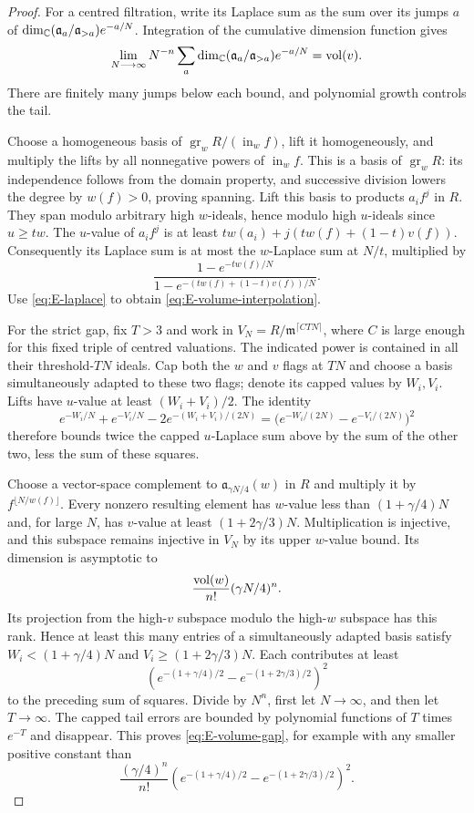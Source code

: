 \begin{proof}
For a centred filtration, write its Laplace sum as the sum over its
jumps $a$ of
$\dim_\mathbb C(\mathfrak a_a/\mathfrak a_{>a})e^{-a/N}$.
Integration of the cumulative dimension function gives
\begin{equation}\label{eq:E-laplace}
 \lim_{N\longrightarrow\infty}N^{-n}
  \sum_a\dim_\mathbb C(\mathfrak a_a/\mathfrak a_{>a})e^{-a/N}
 =\operatorname{vol}(v).
\end{equation}
There are finitely many jumps below each bound, and polynomial growth
controls the tail.

Choose a homogeneous basis of
$\operatorname{gr}_wR/(\operatorname{in}_wf)$, lift it homogeneously,
and multiply the lifts by all nonnegative powers of
$\operatorname{in}_wf$. This is a basis of $\operatorname{gr}_wR$:
its independence follows from the domain property, and successive
division lowers the degree by $w(f)>0$, proving spanning.
Lift this basis to products $a_if^j$ in $R$. They span modulo arbitrary
high $w$-ideals, hence modulo high $u$-ideals since $u\ge tw$.
The $u$-value of $a_if^j$ is at least
$tw(a_i)+j(tw(f)+(1-t)v(f))$. Consequently its Laplace sum is at most
the $w$-Laplace sum at $N/t$, multiplied by
\[
 \frac{1-e^{-tw(f)/N}}
      {1-e^{-(tw(f)+(1-t)v(f))/N}}.
\]
Use \eqref{eq:E-laplace} to obtain
\eqref{eq:E-volume-interpolation}.

For the strict gap, fix $T>3$ and work in
$V_N=R/\mathfrak m^{\lceil CTN\rceil}$, where $C$ is large enough
for this fixed triple of centred valuations. The indicated power is
contained in all their threshold-$TN$ ideals. Cap both the $w$ and
$v$ flags at $TN$ and choose a basis simultaneously adapted to these
two flags; denote its capped values by $W_i,V_i$.
Lifts have $u$-value at least $(W_i+V_i)/2$. The identity
\[
 e^{-W_i/N}+e^{-V_i/N}-2e^{-(W_i+V_i)/(2N)}
     =\bigl(e^{-W_i/(2N)}-e^{-V_i/(2N)}\bigr)^2
\]
therefore bounds twice the capped $u$-Laplace sum above by the sum of
the other two, less the sum of these squares.

Choose a vector-space complement to
$\mathfrak a_{\gamma N/4}(w)$ in $R$ and multiply it by
$f^{\lfloor N/w(f)\rfloor}$. Every nonzero resulting element has
$w$-value less than $(1+\gamma/4)N$ and, for large $N$, has $v$-value
at least $(1+2\gamma/3)N$. Multiplication is injective, and this
subspace remains injective in $V_N$ by its upper $w$-value bound.
Its dimension is asymptotic to
\[
 \frac{\operatorname{vol}(w)}{n!}(\gamma N/4)^n.
\]
Its projection from the high-$v$ subspace modulo the high-$w$
subspace has this rank. Hence at least this many entries of a
simultaneously adapted basis satisfy
$W_i<(1+\gamma/4)N$ and $V_i\ge(1+2\gamma/3)N$.
Each contributes at least
\[
 \left(e^{-(1+\gamma/4)/2}-e^{-(1+2\gamma/3)/2}\right)^2
\]
to the preceding sum of squares. Divide by $N^n$, first let
$N\to\infty$, and then let $T\to\infty$.
The capped tail errors are bounded by polynomial functions of $T$
times $e^{-T}$ and disappear. This proves
\eqref{eq:E-volume-gap}, for example with any smaller positive
constant than
\[
 \frac{(\gamma/4)^n}{n!}
 \left(e^{-(1+\gamma/4)/2}-e^{-(1+2\gamma/3)/2}\right)^2.
\]


\end{proof}

